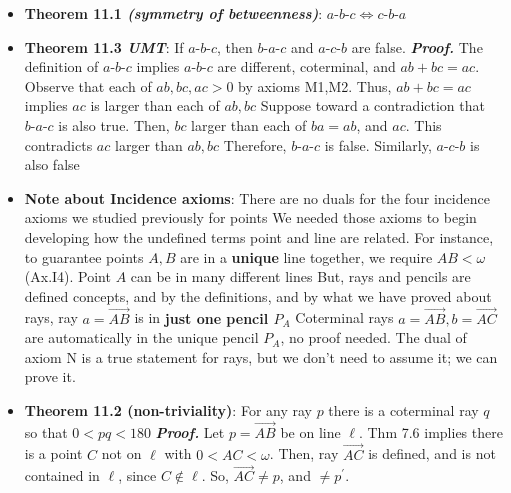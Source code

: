 \documentclass{report}
\begin{document}
\begin{itemize}
\begin{enumerate}[label=(\alph*)]
                    \end{enumerate}
                \item \textbf{Theorem 11.1 \textit{(symmetry of betweenness)}}: $ a\text{-}b\text{-}c \iff c\text{-}b\text{-}a$
                \item \textbf{Theorem 11.3 \textit{UMT}}: If $ a\text{-}b\text{-}c$, then $ b\text{-}a\text{-}c$ and $ a\text{-}c\text{-}b$ are false.
                    \bigbreak \noindent 
                    \textbf{\textit{Proof.}} The definition of $ a\text{-}b\text{-}c$ implies $ a\text{-}b\text{-}c$ are different, coterminal, and $ab + bc = ac$. 
                    \bigbreak \noindent 
                    Observe that each of $ab,bc,ac >0$ by axioms M1,M2. Thus, $ab + bc =ac$ implies $ac$ is larger than each of $ab,bc$
                    \bigbreak \noindent 
                    Suppose toward a contradiction that $ b\text{-}a\text{-}c$ is also true. Then, $ bc$ larger than each of $ba = ab$, and $ac$. This contradicts $ac$ larger than $ab, bc $
                    \bigbreak \noindent 
                    Therefore, $ b\text{-}a\text{-}c$ is false. Similarly, $ a\text{-}c\text{-}b$ is also false \endpf
                \item \textbf{Note about Incidence axioms}: There are no duals for the four incidence axioms we studied previously for points
                    \bigbreak \noindent 
                    We needed those axioms to begin developing how the undefined terms point and line are related. For instance, to guarantee points $A,B$ are in a \textbf{unique} line together, we require $AB < \omega$ (Ax.I4). Point $A$ can be in many different lines
                    \bigbreak \noindent 
                    But, rays and pencils are defined concepts, and by the definitions, and by what we have proved about rays, ray $a = \overrightarrow{AB}$ is in \textbf{just one pencil $P_{A} $}
                    \bigbreak \noindent 
                    Coterminal rays $a = \overrightarrow{AB}, b = \overrightarrow{AC}$ are automatically in the unique pencil $P_{A}$, no proof needed.
                    \bigbreak \noindent 
                    The dual of axiom N is a true statement for rays, but we don't need to assume it; we can prove it.
                \item \textbf{Theorem 11.2 (non-triviality)}: For any ray $p$ there is a coterminal ray $q$ so that $0 < pq < 180$
                    \bigbreak \noindent 
                    \textbf{\textit{Proof.}} Let $p = \overrightarrow{AB}$ be on line $\ell$. Thm 7.6 implies there is a point $C$ not on $\ell$ with $0 < AC < \omega$. Then, ray $\overrightarrow{AC}$ is defined, and is not contained in $\ell$, since $C \not\in \ell$. So, $\overrightarrow{AC} \ne p$, and $\ne p^{\prime}$. 

\end{itemize}
\end{document}
